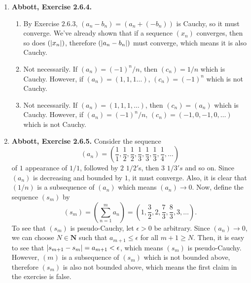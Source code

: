 \documentclass{article}
\DeclarePairedDelimiter\abs{\lvert}{\rvert}
\newcommand{\N}{\mathbf{N}}
\newcommand{\R}{\mathbf{R}}
\newcommand{\exc}[2][Abbott]{\item \textbf{#1, Exercise #2.}}
\newcommand{\lep}[1][L]{#1et $\epsilon > 0$ be arbitrary}
\begin{document}
\begin{enumerate}
\begin{enumerate}
        \item \lep. Since both sequences are Cauchy, we can pick some positive $M_1, M_2 \in \R$ such that $\abs*{x_n} \leq M_1$ and $\abs*{y_n} \leq M_2$ for all $n \in \N$. Choose $N \in \N$ such that $\abs*{x_n-x_m} < \epsilon/(2M_2)$ and $\abs*{y_n-y_m} < \epsilon/(2M_1)$ for all $n, m \geq N$. Then,
        \begin{align*}
            \abs*{x_n y_n - x_m y_m} &= \abs*{x_n y_n - x_n y_m + x_n y_m - x_m y_m} \\
            &\leq \abs*{x_n} \abs*{y_n - y_m} + \abs*{y_m} \abs*{x_n - x_m} \\ &\leq M_1 \abs*{y_n-y_m} + M_2 \abs*{x_n - x_m} < \epsilon
        \end{align*} for all $n,m \geq N$, so $(x_n y_n)$ is Cauchy.
    \end{enumerate}
    
    \exc{2.6.4}
    \begin{enumerate}
        \item By Exercise $2.6.3$, $(a_n - b_n) = (a_n + (-b_n))$ is Cauchy, so it must converge. We've already shown that if a sequence $(x_n)$ converges, then so does $(\abs*{x_n})$, therefore $(\abs*{a_n-b_n})$ must converge, which means it is also Cauchy.
        
        \item Not necessarily. If $(a_n) = (-1)^n/n$, then $(c_n) = 1/n$ which is Cauchy. However, if $(a_n) = (1,1,1\dots)$, $(c_n) = (-1)^n$ which is not Cauchy.
        
        \item Not necessarily. If $(a_n) = (1,1,1,\dots)$, then $(c_n) = (a_n)$ which is Cauchy. However, if $(a_n) = (-1)^n/n$, $(c_n) = (-1, 0,-1, 0, \dots)$ which is not Cauchy.
    \end{enumerate}
    
    \exc{2.6.5}
    Consider the sequence 
    \begin{equation*}
        (a_n) = (\frac{1}{1}, \frac{1}{2}, \frac{1}{2}, \frac{1}{3}, \frac{1}{3}, \frac{1}{3}, \frac{1}{4}, \dots)
    \end{equation*} of $1$ appearance of $1/1$, followed by $2$ $1/2'$s, then $3$ $1/3's$ and so on. Since $(a_n)$ is decreasing and bounded by $1$, it must converge. Also, it is clear that $(1/n)$ is a subsequence of $(a_n)$ which means $(a_n) \to 0$. Now, define the sequence $(s_m)$ by
    \begin{equation*}
        (s_m) = (\sum_{n=1}^m a_n) = (1, \frac{3}{2}, 2, \frac{7}{3}, \frac{8}{3}, 3, \dots).
    \end{equation*} To see that $(s_m)$ is pseudo-Cauchy, \lep[l]. Since $(a_n) \to 0$, we can choose $N \in \N$ such that $a_{m+1} \leq \epsilon$ for all $m+1 \geq N$. Then, it is easy to see that $\abs*{s_{m+1}-s_m} = a_{m+1} < \epsilon$, which means $(s_m)$ is pseudo-Cauchy. However, $(m)$ is a subsequence of $(s_m)$ which is not bounded above, therefore $(s_m)$ is also not bounded above, which means the first claim in the exercise is false.
    

\end{enumerate}
\end{document}
